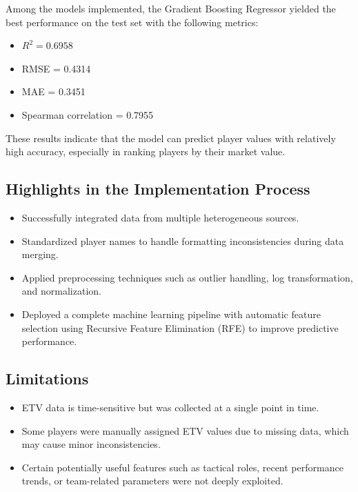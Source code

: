 \documentclass[12pt,a4paper]{article}
\begin{document}
Among the models implemented, the Gradient Boosting Regressor yielded the best performance on the test set with the following metrics:
\begin{itemize}
    \item $R^2 = 0.6958$
    \item RMSE = 0.4314
    \item MAE = 0.3451
    \item Spearman correlation = 0.7955
\end{itemize}
These results indicate that the model can predict player values with relatively high accuracy, especially in ranking players by their market value.

\subsection{Highlights in the Implementation Process}
\begin{itemize}
    \item Successfully integrated data from multiple heterogeneous sources.
    \item Standardized player names to handle formatting inconsistencies during data merging.
    \item Applied preprocessing techniques such as outlier handling, log transformation, and normalization.
    \item Deployed a complete machine learning pipeline with automatic feature selection using Recursive Feature Elimination (RFE) to improve predictive performance.
\end{itemize}

\subsection{Limitations}
\begin{itemize}
    \item ETV data is time-sensitive but was collected at a single point in time.
    \item Some players were manually assigned ETV values due to missing data, which may cause minor inconsistencies.
    \item Certain potentially useful features such as tactical roles, recent performance trends, or team-related parameters were not deeply exploited.
\end{itemize}
\end{document}
